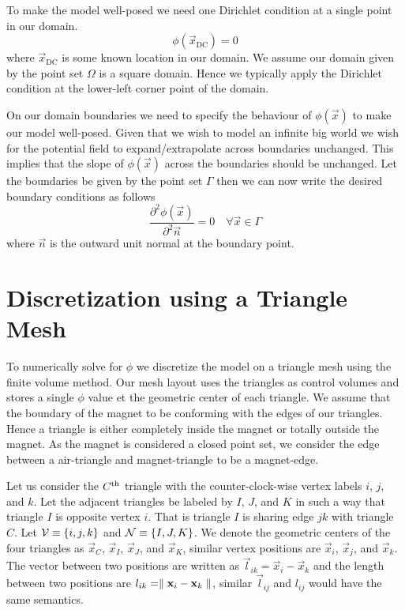 \documentclass[preprint,nocopyrightspace]{sigplanconf}
\begin{document}
To make the model well-posed we need one Dirichlet condition at a
single point in our domain.
\begin{equation}
  \phi(\vec x_{\text{DC}}) = 0
\end{equation}
where $\vec x_{\text{DC}}$ is some known location in our domain.  We
assume our domain given by the point set $\Omega$ is a square
domain. Hence we typically apply the Dirichlet condition at the
lower-left corner point of the domain.

On our domain boundaries we need to specify the behaviour of
$\phi(\vec x)$ to make our model well-posed.  Given that we wish to
model an infinite big world we wish for the potential field to
expand/extrapolate across boundaries unchanged. This implies that the
slope of $\phi(\vec x)$ across the boundaries should be unchanged. Let
the boundaries be given by the point set $\Gamma$ then we can now
write the desired boundary conditions as follows
\begin{equation}
  \frac{\partial^2  \phi(\vec x) }{\partial^2 \vec n} = 0 \quad \forall
  \vec x \in \Gamma
\end{equation}
where $\vec n$ is the outward unit normal at the boundary point.

\section{Discretization using a Triangle Mesh}
\label{sec:discretization}
To numerically solve for $\phi$ we discretize the model on a triangle
mesh using the finite volume method. Our mesh layout uses the
triangles as control volumes and stores a single $\phi$ value et the
geometric center of each triangle. We assume that the boundary of the
magnet to be conforming with the edges of our triangles. Hence a
triangle is either completely inside the magnet or totally outside the
magnet. As the magnet is considered a closed point set, we consider
the edge between a air-triangle and magnet-triangle to be a
magnet-edge.

Let us consider the $C ^{\text{th}}$ triangle with the counter-clock-wise vertex
labels $i$, $j$, and $k$. Let the adjacent triangles be labeled by
$I$, $J$, and $K$ in such a way that triangle $I$ is opposite vertex
$i$. That is triangle $I$ is sharing edge $jk$ with triangle $C$.  Let
$\mathcal{V} \equiv \{i, j, k\}$ and $\mathcal{N} \equiv\{ I, J, K\}$. We denote
the geometric centers of the four triangles as $\vec x_C$, $\vec x_I$,
$\vec x_J$, and $\vec x_K$, similar vertex positions are $\vec x_i$,
$\vec x_j$, and $\vec x_k$. The vector between two positions are
written as $\vec l_{ik} = \vec x_i - \vec x_k$ and the length between
two positions are $l_{ik} = \parallel {  \ensuremath{\mathbf{x} } _i- \ensuremath{\mathbf{x} } _k} \parallel$, similar $\vec
l_{ij}$ and $l_{ij}$ would have the same semantics.
\end{document}
